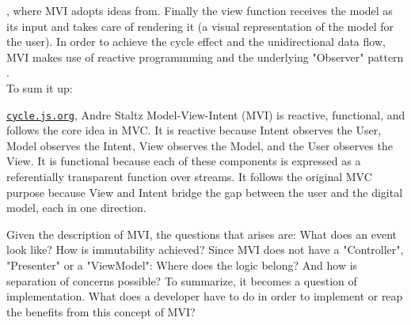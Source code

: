 \cite{functionalProgrammingWikiHaskell,functionalProgrammingPractical,programmingInHaskellFunctionalProgrammingDefinition},
where MVI adopts ideas from.
Finally the view function receives the model as its input and takes care of rendering it (a visual representation of the model for the user). 
In order to achieve the cycle effect and the unidirectional data flow, MVI makes use of reactive programmming 
\cite{reactiveProgrammingIntroAndreStaltz} 
and the underlying "Observer" pattern 
\cite{wikipediaObserverPattern}.
\\
To sum it up:
\begin{pquotation}{\href{https://cycle.js.org/model-view-intent.html#model-view-intent-what-mvc-is-really-about}{\nolinkurl{cycle.js.org}}, Andre Staltz}
    Model-View-Intent (MVI) is reactive, functional, and follows the core idea in MVC. It is reactive because Intent observes the User, Model observes the Intent, 
    View observes the Model, and the User observes the View. It is functional because each of these components is expressed as a referentially transparent function 
    over streams. It follows the original MVC purpose because View and Intent bridge the gap between the user and the digital model, each in one direction.
\end{pquotation}
Given the description of MVI, the questions that arises are: What does an event look like? How is immutability achieved?
Since MVI does not have a "Controller", "Presenter" or a "ViewModel": Where does the logic belong? And how is separation of concerns possible?
To summarize, it becomes a question of implementation. What does a developer have to do in order to implement or reap the benefits from this concept of MVI?

